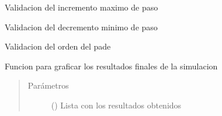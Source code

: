 \documentclass[letterpaper,10pt,spanish]{sphinxmanual}
\begin{document}
\begin{fulllineitems}
\label{\detokenize{codigos/simulacionHandler:simulacionHandler.maxstep_validator}}
Validacion del incremento maximo de paso

\end{fulllineitems}


\begin{fulllineitems}
\label{\detokenize{codigos/simulacionHandler:simulacionHandler.minstep_validator}}
Validacion del decremento minimo de paso

\end{fulllineitems}


\begin{fulllineitems}
\label{\detokenize{codigos/simulacionHandler:simulacionHandler.pade_validator}}
Validacion del orden del pade

\end{fulllineitems}


\begin{fulllineitems}
\label{\detokenize{codigos/simulacionHandler:simulacionHandler.plot_final_results}}
Funcion para graficar los resultados finales de la simulacion
\begin{quote}\begin{description}
\item[{Parámetros}] \leavevmode
{} () \textendash{} Lista con los resultados obtenidos

\end{description}\end{quote}

\end{fulllineitems}
\end{document}
